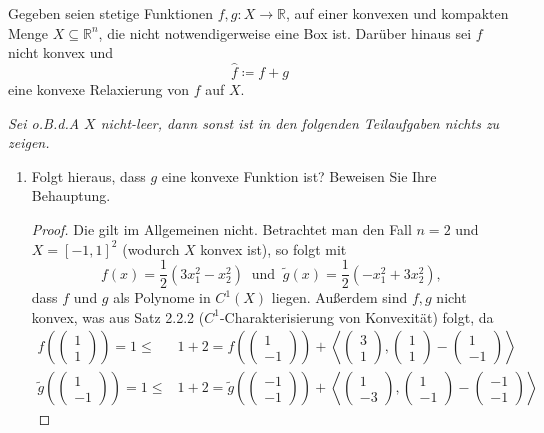 \documentclass[12pt]{extreport} %
\newcommand{\R}{\mathbb{R}}
\begin{document}
Gegeben seien stetige Funktionen $f, g \colon X \rightarrow \R$, auf einer konvexen und kompakten Menge $X \subseteq \R^n$, die nicht notwendigerweise eine Box ist. Darüber hinaus sei $f$ nicht konvex und 
	$$ \hat{f} \coloneqq f + g $$
eine konvexe Relaxierung von $f$ auf $X$.

\textit{Sei o.B.d.A $X$ nicht-leer, dann sonst ist in den folgenden Teilaufgaben nichts zu zeigen.}	
	
\begin{enumerate}
	\item Folgt hieraus, dass $g$ eine konvexe Funktion ist? Beweisen Sie Ihre Behauptung.
		\begin{proof}
			Die gilt im Allgemeinen nicht. Betrachtet man den Fall $n = 2$ und $X = [-1, 1]^2$ (wodurch $X$ konvex ist), so folgt mit 
			$$ f(x) = \frac{1}{2} \left( 3 x_1^2 -  x_2^2 \right) ~ \text{ und } ~ \tilde{g}(x) = \frac{1}{2} \left( -x_1^2 + 3 x_2^2 \right), $$
			 dass $f$ und $g$ als Polynome in $C^1(X)$ liegen. Außerdem sind $f, g$ nicht konvex, was aus Satz 2.2.2 ($C^1$-Charakterisierung von Konvexität) folgt, da
			\begin{align*}
				f \left(\begin{pmatrix} 1 \\ 1 \end{pmatrix} \right) = 1 \leq & 1 + 2 = f \left(\begin{pmatrix} 1 \\ -1 \end{pmatrix} \right) + \left\langle \begin{pmatrix} 3 \\ 1 \end{pmatrix} ,  \begin{pmatrix} 1 \\ 1 \end{pmatrix} -  \begin{pmatrix} 1 \\ -1 \end{pmatrix} \right\rangle \\
				\tilde{g} \left(\begin{pmatrix} 1 \\ -1 \end{pmatrix} \right) = 1 \leq & 1 + 2 = \tilde{g} \left(\begin{pmatrix} -1 \\ -1 \end{pmatrix} \right) + \left\langle \begin{pmatrix} 1 \\ -3 \end{pmatrix} ,  \begin{pmatrix} 1 \\ -1 \end{pmatrix} -  \begin{pmatrix} -1 \\ -1 \end{pmatrix} \right\rangle \

\end{align*}
\end{proof}
\end{enumerate}
\end{document}

